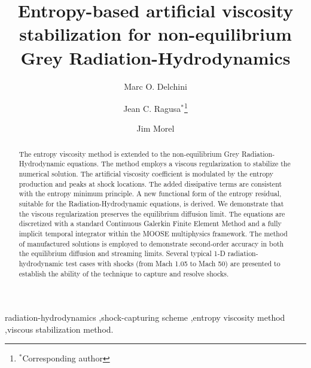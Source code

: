 \documentclass[review]{elsarticle}
\begin{document}
%
\begin{frontmatter}
%
\title{Entropy-based artificial viscosity stabilization for non-equilibrium Grey Radiation-Hydrodynamics}
\author{Marc O. Delchini}
%
\author{Jean C. Ragusa$^*$\footnote{$^*$Corresponding author}}
%
\author{Jim Morel}

\address[label1]{Department of Nuclear Engineering, Texas A\&M University, College Station, TX 77843, USA }

\begin{abstract}
The entropy viscosity method is extended to the non-equilibrium Grey Radiation-Hydrodynamic equations. 
The method employs a viscous regularization to stabilize the numerical solution. The artificial viscosity coefficient is modulated by the entropy production and peaks at shock locations. The added dissipative terms are consistent with the entropy minimum principle.  A new functional form of the entropy residual, suitable for the Radiation-Hydrodynamic equations, is derived. We demonstrate that the viscous regularization preserves the equilibrium diffusion limit. The equations are discretized with a standard Continuous Galerkin Finite Element Method and a fully implicit temporal integrator within the MOOSE multiphysics framework. The method of manufactured solutions is employed to demonstrate second-order accuracy in both the equilibrium diffusion and streaming limits. Several typical 1-D radiation-hydrodynamic test cases with shocks (from Mach 1.05 to Mach 50) are presented to establish the ability of the technique to capture and resolve shocks. %
\end{abstract}
%
\begin{keyword}
radiation-hydrodynamics \sep shock-capturing scheme \sep entropy viscosity method \sep viscous stabilization method.
\end{keyword}
%
\end{frontmatter}
%
\linenumbers
%
\end{document}
